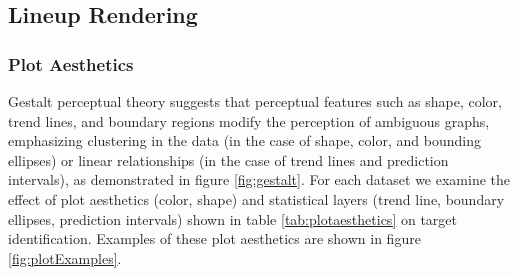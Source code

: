 \documentclass[11pt]{isuthesis}\usepackage[]{graphicx}\usepackage[]{color}
\begin{document}
\subsection{Lineup Rendering}
\subsubsection{Plot Aesthetics}
Gestalt perceptual theory suggests that perceptual features such as shape, color, trend lines, and boundary regions modify the perception of ambiguous graphs, emphasizing clustering in the data (in the case of shape, color, and bounding ellipses) or linear relationships (in the case of trend lines and prediction intervals), as demonstrated in figure \ref{fig:gestalt}. For each dataset we examine the effect of plot aesthetics (color, shape) and statistical layers (trend line, boundary ellipses, prediction intervals) shown in table \ref{tab:plotaesthetics}  on target identification. Examples of these plot aesthetics are shown in figure \ref{fig:plotExamples}.
\end{document}
